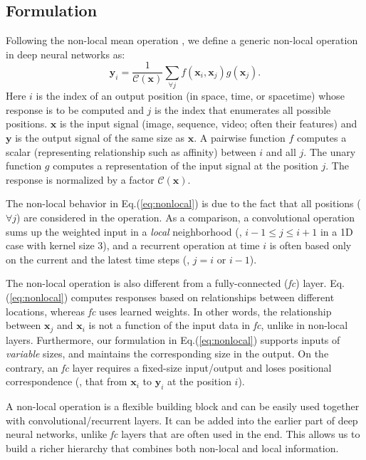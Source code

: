 \documentclass[10pt,twocolumn,letterpaper]{article}
\newcommand{\ve}[1]{\mathbf{#1}} %
\begin{document}
\subsection{Formulation}
Following the non-local mean operation \cite{Buades2005}, we define a generic non-local operation in deep neural networks as:
\begin{equation}\label{eq:nonlocal}
\ve{y}_i = \frac{1}{\mathcal{C(\ve{x})}} \sum_{\forall j}f(\ve{x}_i, \ve{x}_j)g(\ve{x}_j).
\end{equation}
Here $i$ is the index of an output position (in space, time, or spacetime) whose response is to be computed and $j$ is the index that enumerates all possible positions. $\ve{x}$ is the input signal (image, sequence, video; often their features) and $\ve{y}$ is the output signal of the same size as $\ve{x}$. A pairwise function $f$ computes a scalar (representing relationship such as affinity) between $i$ and all $j$. The unary function $g$ computes a representation of the input signal at the position $j$. The response is normalized by a factor $\mathcal{C}(\ve{x})$.

The non-local behavior in Eq.(\ref{eq:nonlocal}) is due to the fact that all positions ($\forall j$) are considered in the operation. As a comparison, a convolutional operation sums up the  weighted input in a \emph{local} neighborhood (\eg, $i-1\leq j \leq i+1$ in a 1D case with kernel size 3), and a recurrent operation at time $i$ is often based only on the current and the latest time steps (\eg, $j=i$ or $i-1$).

The non-local operation is also different from a fully-connected (\emph{fc}) layer. Eq.(\ref{eq:nonlocal}) computes responses based on relationships between different locations, whereas \emph{fc} uses learned weights. In other words, the relationship between $\ve{x}_j$ and $\ve{x}_i$ is not a function of the input data in \emph{fc}, unlike in non-local layers. Furthermore, our formulation in Eq.(\ref{eq:nonlocal}) supports inputs of \emph{variable} sizes, and maintains the corresponding size in the output.
On the contrary, an \emph{fc} layer requires a fixed-size input/output and loses positional correspondence (\eg, that from $\ve{x}_i$ to $\ve{y}_i$ at the position $i$).

A non-local operation is a flexible building block and can be easily used together with convolutional/recurrent layers. It can be added into the earlier part of deep neural networks, unlike \emph{fc} layers that are often used in the end.
This allows us to build a richer hierarchy that combines both non-local and local information.
\end{document}
